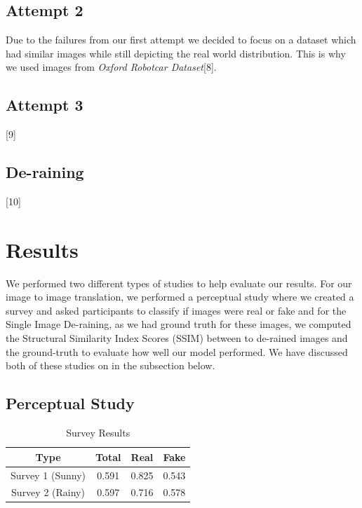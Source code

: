 \documentclass{article}
\begin{document}
\subsection{Attempt 2}

Due to the failures from our first attempt we decided to focus on a dataset which had similar images while still depicting the real world distribution. This is why we used images from \textit{Oxford Robotcar Dataset}[8]. 

\subsection{Attempt 3}

[9]


\subsection{De-raining}

[10]


\section{Results}

We performed two different types of studies to help evaluate our results. For our image to image translation, we performed a perceptual study where we created a survey and asked participants to classify if images were real or fake and for the Single Image De-raining, as we had ground truth for these images, we computed the Structural Similarity Index Scores (SSIM) between to de-rained images and the ground-truth to evaluate how well our model performed. We have discussed both of these studies on in the subsection below.

\subsection{Perceptual Study}

\begin{table} [h!]
\centering
\begin{tabular}{ | c | c | c | c |}
\hline
 Type & Total & Real & Fake \\ 
\hline
 Survey 1 (Sunny) &  0.591 & 0.825 & 0.543 \\  
 Survey 2 (Rainy) & 0.597 & 0.716 & 0.578 \\
 \hline
\end{tabular}
\caption{Survey Results}
\label{table:1}
\end{table}
\end{document}
